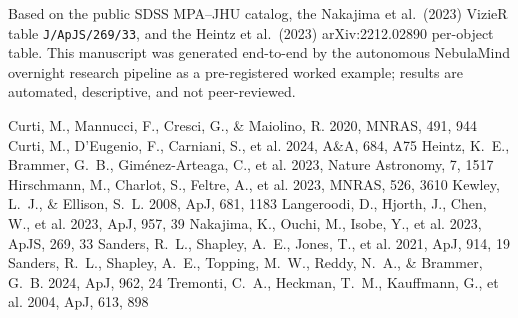\documentclass[twocolumn]{aastex631}
\begin{document}
\begin{acknowledgments}
Based on the public SDSS MPA--JHU catalog, the Nakajima et al.\ (2023) VizieR table \texttt{J/ApJS/269/33}, and the Heintz et al.\ (2023) arXiv:2212.02890 per-object table. This manuscript was generated end-to-end by the autonomous NebulaMind overnight research pipeline as a pre-registered worked example; results are automated, descriptive, and not peer-reviewed.
\end{acknowledgments}

\begin{thebibliography}{}
 Curti, M., Mannucci, F., Cresci, G., \& Maiolino, R. 2020, MNRAS, 491, 944
 Curti, M., D'Eugenio, F., Carniani, S., et al. 2024, A\&A, 684, A75
 Heintz, K.~E., Brammer, G.~B., Giménez-Arteaga, C., et al. 2023, Nature Astronomy, 7, 1517
 Hirschmann, M., Charlot, S., Feltre, A., et al. 2023, MNRAS, 526, 3610
 Kewley, L.~J., \& Ellison, S.~L. 2008, ApJ, 681, 1183
 Langeroodi, D., Hjorth, J., Chen, W., et al. 2023, ApJ, 957, 39
 Nakajima, K., Ouchi, M., Isobe, Y., et al. 2023, ApJS, 269, 33
 Sanders, R.~L., Shapley, A.~E., Jones, T., et al. 2021, ApJ, 914, 19
 Sanders, R.~L., Shapley, A.~E., Topping, M.~W., Reddy, N.~A., \& Brammer, G.~B. 2024, ApJ, 962, 24
 Tremonti, C.~A., Heckman, T.~M., Kauffmann, G., et al. 2004, ApJ, 613, 898
\end{thebibliography}
\end{document}
